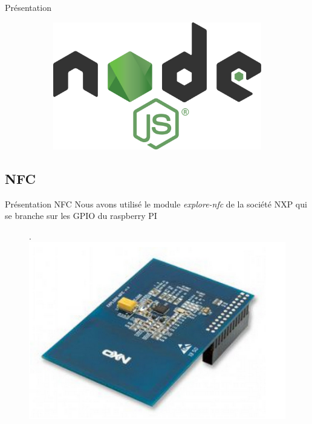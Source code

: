\documentclass[aspectratio=169]{beamer}
\begin{document}
\begin{frame}{Présentation}
\begin{figure}
\begin{subfigure}{.2\textwidth}
    \end{subfigure}
    \begin{subfigure}{.2\textwidth}
      \centering
      \includegraphics[width=.8\linewidth]{../assets/nodejs.png}
    \end{subfigure}
  \end{figure}
\end{frame}

\subsection{NFC}

\begin{frame}{Présentation NFC}
  Nous avons utilisé le module \textit{explore-nfc} de la société NXP qui se branche sur les GPIO du raspberry PI
  \begin{figure}.
    \includegraphics[width=.5\textwidth]{../assets/explorenfc.png}
  \end{figure}
\end{frame}
\end{document}
